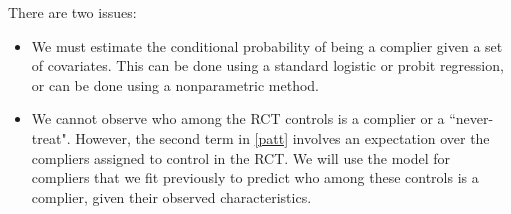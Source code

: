 \documentclass{article}
\begin{document}
There are two issues:
\begin{itemize}
\item We must estimate the conditional probability of being a complier given a set of covariates.  This can be done using a standard logistic or probit regression, or can be done using a nonparametric method.
\item We cannot observe who among the RCT controls is a complier or a ``never-treat".  However, the second term in \eqref{patt} involves an expectation over the compliers assigned to control in the RCT.  We will use the model for compliers that we fit previously to predict who among these controls is a complier, given their observed characteristics.
\end{itemize}
\end{document}
